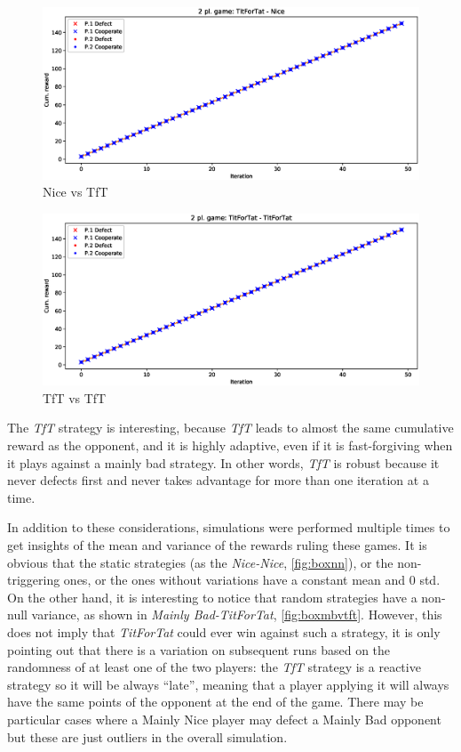 \documentclass[journal,10pt,twoside]{IEEEtran}
\begin{document}
\begin{figure}[!ht]
    \centering
    \includegraphics[width=1\columnwidth]{../img/ipd2p/ipd2p-rewards-TitForTat-Nice}
    \caption{Nice vs TfT}
    \label{fig:nicevstft}
\end{figure}

\begin{figure}[!ht]
    \centering
    \includegraphics[width=1\columnwidth]{../img/ipd2p/ipd2p-rewards-TitForTat-TitForTat}
    \caption{TfT vs TfT}
    \label{fig:tftvstft}
\end{figure}

The \textit{TfT} strategy is interesting, because \textit{TfT} leads to almost the same cumulative reward as the opponent, and it is highly adaptive, even if it is fast-forgiving when it plays against a mainly bad strategy. In other words, \textit{TfT} is robust because it never defects first and never takes advantage for more than one iteration at a time.~\cite{fogelEvolvingBehaviors}

In addition to these considerations, simulations were performed multiple times to get insights of the mean and variance of the rewards ruling these games. It is obvious that the static strategies (as the \textit{Nice-Nice}, \autoref{fig:boxnn}), or the non-triggering ones, or the ones without variations have a constant mean and $0$ std. On the other hand, it is interesting to notice that random strategies have a non-null variance, as shown in \textit{Mainly Bad-TitForTat}, \autoref{fig:boxmbvtft}. However, this does not imply that \textit{TitForTat} could ever win against such a strategy, it is only pointing out that there is a variation on subsequent runs based on the randomness of at least one of the two players: the \textit{TfT} strategy is a reactive strategy so it will be always ``late'', meaning that a player applying it will always have the same points of the opponent at the end of the game. There may be particular cases where a Mainly Nice player may defect a Mainly Bad opponent but these are just outliers in the overall simulation.
\end{document}
